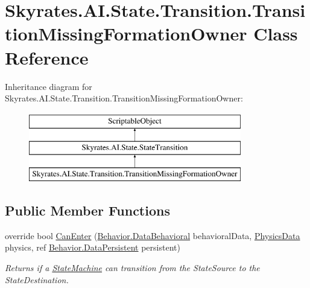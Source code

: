 \hypertarget{class_skyrates_1_1_a_i_1_1_state_1_1_transition_1_1_transition_missing_formation_owner}{\section{Skyrates.\-A\-I.\-State.\-Transition.\-Transition\-Missing\-Formation\-Owner Class Reference}
\label{class_skyrates_1_1_a_i_1_1_state_1_1_transition_1_1_transition_missing_formation_owner}
}
Inheritance diagram for Skyrates.\-A\-I.\-State.\-Transition.\-Transition\-Missing\-Formation\-Owner\-:\begin{figure}[H]
\begin{center}
\leavevmode
\includegraphics[height=3.000000cm]{class_skyrates_1_1_a_i_1_1_state_1_1_transition_1_1_transition_missing_formation_owner}
\end{center}
\end{figure}
\subsection*{Public Member Functions}
\begin{DoxyCompactItemize}
\item 
override bool \hyperlink{class_skyrates_1_1_a_i_1_1_state_1_1_transition_1_1_transition_missing_formation_owner_a5007021285f55c85bec2bf2fee921deb}{Can\-Enter} (\hyperlink{class_skyrates_1_1_a_i_1_1_behavior_1_1_data_behavioral}{Behavior.\-Data\-Behavioral} behavioral\-Data, \hyperlink{class_skyrates_1_1_physics_1_1_physics_data}{Physics\-Data} physics, ref \hyperlink{class_skyrates_1_1_a_i_1_1_behavior_1_1_data_persistent}{Behavior.\-Data\-Persistent} persistent)
\begin{DoxyCompactList}\small\item\em Returns if a \hyperlink{class_skyrates_1_1_a_i_1_1_state_1_1_state_machine}{State\-Machine} can transition from the State\-Source to the State\-Destination. \end{DoxyCompactList}\end{DoxyCompactItemize}



